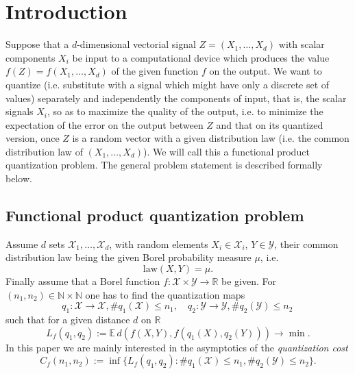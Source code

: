 \documentclass{amsart}
\theoremstyle{remark}
\numberwithin{equation}{section}
\numberwithin{figure}{section}
\newcommand{\R}{\mathbb{R}}
\newcommand{\N}{\mathbb{N}}
\def\mX{\mathcal{X}}
\def\mY{\mathcal{Y}}
\begin{document}
\tableofcontents

\section{Introduction}

Suppose that a $d$-dimensional vectorial signal $Z=(X_1, \ldots, X_d)$ with scalar components $X_i$ be input to a computational device which
produces the value $f(Z)= f(X_1, \ldots, X_d)$ of the given function $f$ on the output. We want to quantize (i.e. substitute with a signal which might have only a discrete set of values) separately and independently the components of input, that is,
the scalar signals $X_i$, so as to maximize the quality of the output, i.e. to minimize the expectation of the error on the output
between $Z$ and that on its quantized version, 
once $Z$ is a random vector with a given distribution law (i.e. the common distribution law of 
$(X_1, \ldots, X_d)$). We will call this a functional product quantization problem.
The general problem statement is described formally below.

\subsection{Functional product quantization problem}	
Assume $d$ sets $\mX_1, \ldots, \mX_d$, with random elements 
$X_i\in \mX_i$, $Y\in \mY$, their common distribution law being the given Borel probability measure $\mu$, i.e.\
\[\textrm{law}(X, Y)=\mu.\]
Finally assume that a Borel function $f\colon \mX \times \mY \to \R$ be given.
For $(n_1, n_2)\in \N\times \N$	one has to find the quantization maps
\[q_1\colon \mX\to \mX,  \#q_1(\mX) \leq n_1, \quad q_2 \colon \mY \to \mY, \# q_2(\mY) \leq n_2 \,\]
such that for a given distance $d$ on $\mathbb{R}$ 
\[
L_f(q_1, q_2):=\mathbb{E}\, d\left( f\left(X, Y\right), f\left(q_1(X),q_2(Y)\right)\right) \to\min.
\]
In this paper we are mainly interested in the asymptotics of the \textit{quantization cost}
\[
C_f(n_1,n_2):= \inf \{ L_f(q_1, q_2)\colon \#q_1(\mX)\leq n_1,  \#q_2(\mY)\leq n_2 \}.
\]
\end{document}
